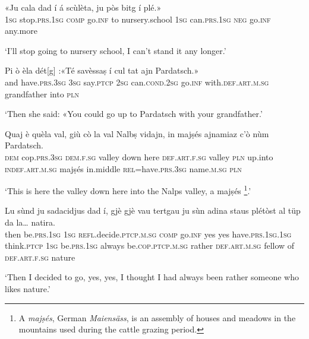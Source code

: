 \begin{linenumbers}
\gll  «Ju cala dad í á scùlèta, ju pòs bitg í plé.»\\
 \textsc{1sg} stop.\textsc{prs.1sg} \textsc{comp} go.\textsc{inf} to nursery.school \textsc{1sg} can.\textsc{prs.1sg} \textsc{neg} go.\textsc{inf} any.more  \\
\end{linenumbers}
\medskip
\glt `I’ll stop going to nursery school, I can’t stand it any longer.'
\medskip

\begin{linenumbers}
\gll  Pi ò èla dét[g] :«Té savèssaṣ í cul tat ajn Pardatsch.»  \\
and have.\textsc{prs.3sg} \textsc{3sg} say.\textsc{ptcp} \textsc{2sg} can.\textsc{cond.2sg} go.\textsc{inf} with.\textsc{def.art.m.sg} grandfather into \textsc{pln}  \\
\end{linenumbers}
\medskip
\glt `Then she said: «You could go up to Pardatsch with your grandfather.'
\medskip

\begin{linenumbers}
\gll Quaj è quèla val, giù cò la val Nalbṣ vidajn, in majṣés ajnamiaz c'ò nùm Pardatsch.  \\ 
 \textsc{dem} cop.\textsc{prs.3sg} \textsc{dem.f.sg} valley down here  \textsc{def.art.f.sg} valley  \textsc{pln} up.into \textsc{indef.art.m.sg} majṣés in.middle \textsc{rel=}have.\textsc{prs.3sg} name.\textsc{m.sg} \textsc{pln}\\
\end{linenumbers}
\medskip
\glt `This is here the valley down here into the Nalps valley, a majṣés \footnote{A \textit{majṣés}, German \textit{Maiensäss}, is an assembly of houses and meadows in the mountains used during the cattle grazing period.}.'
\medskip

\begin{linenumbers}
\gll  Lu sùnd ju sadacidjus dad í, gjè gjè vau tertgau ju sùn adina staus plétòst al tüp da la… natira.  \\
then be.\textsc{prs.1sg} \textsc{1sg} \textsc{refl.}decide.\textsc{ptcp.m.sg} \textsc{comp} go.\textsc{inf} yes yes have.\textsc{prs.1sg.1sg} think.\textsc{ptcp} \textsc{1sg} be.\textsc{prs.1sg} always be.\textsc{cop.ptcp.m.sg} rather \textsc{def.art.m.sg} fellow of \textsc{def.art.f.sg} nature   \\
\end{linenumbers}
\medskip
\glt `Then I decided to go, yes, yes, I thought I had always been rather someone who likes nature.'
\medskip

